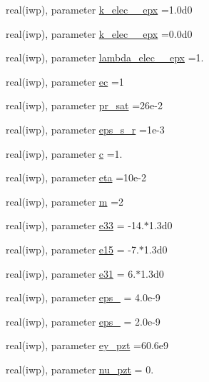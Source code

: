 \begin{DoxyCompactItemize}
\item 
real(iwp), parameter \hyperlink{classmaterial__behavior_ae6627960fae7dc38934722c9097db8e1}{k\+\_\+elec\+\_\+\_\+epx} =1.\+0d0
\item 
real(iwp), parameter \hyperlink{classmaterial__behavior_a821416be28a36a49165c9c8a50556c81}{k\+\_\+elec\+\_\+\_\+epx} =0.\+0d0
\item 
real(iwp), parameter \hyperlink{classmaterial__behavior_a4d52ced459ab4f48c6c53abdf2e315d3}{lambda\+\_\+elec\+\_\+\_\+epx} =1.
\item 
real(iwp), parameter \hyperlink{classmaterial__behavior_aba1ffb56b1ab0b9db9d3b8bab9babf69}{ec} =1
\item 
real(iwp), parameter \hyperlink{classmaterial__behavior_a002007fbb0f53f0989500f268c5d68bd}{pr\+\_\+sat} =26e-\/2
\item 
real(iwp), parameter \hyperlink{classmaterial__behavior_a86dd93cf767f5c49d0fb9ab7ad275a20}{eps\+\_\+s\+\_\+r} =1e-\/3
\item 
real(iwp), parameter \hyperlink{classmaterial__behavior_a3d67223e37edfba954fbb0e15fd534f0}{c} =1.
\item 
real(iwp), parameter \hyperlink{classmaterial__behavior_a104619662a09d0a702a9f20d7e79f0e8}{eta} =10e-\/2
\item 
real(iwp), parameter \hyperlink{classmaterial__behavior_a485aff3d8ce94cb516029491df025096}{m} =2
\item 
real(iwp), parameter \hyperlink{classmaterial__behavior_adecdfb65aad0a27a4cfecf7a0a2e7405}{e33} = -\/14.$\ast$1.\+3d0
\item 
real(iwp), parameter \hyperlink{classmaterial__behavior_a41c97072565322765eab89326d043974}{e15} = -\/7.$\ast$1.\+3d0
\item 
real(iwp), parameter \hyperlink{classmaterial__behavior_acdda737936afdd1e2f7fa95ac0ec1e47}{e31} = 6.$\ast$1.\+3d0
\item 
real(iwp), parameter \hyperlink{classmaterial__behavior_a81d04c6527efb7912c556fabb6e2bfe5}{eps\+\_} = 4.\+0e-\/9
\item 
real(iwp), parameter \hyperlink{classmaterial__behavior_a0269e4c7b93fc3e0ec2123138e74735b}{eps\+\_} = 2.\+0e-\/9
\item 
real(iwp), parameter \hyperlink{classmaterial__behavior_a5443aaa8c75e639c0e7e610db47365f4}{ey\+\_\+pzt} =60.\+6e9
\item 
real(iwp), parameter \hyperlink{classmaterial__behavior_aa17e406d8f9854210f8715a752d70e43}{nu\+\_\+pzt} = 0.
\item 

\end{DoxyCompactItemize}
